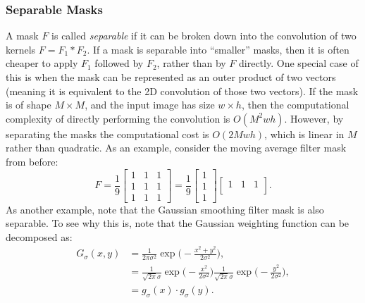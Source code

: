 \subsubsection{Separable Masks}
A mask $F$ is called \textit{separable} if it can be broken down into the convolution of two kernels $F = F_1 \ast F_2$. If a mask is separable into ``smaller'' masks, then it is often cheaper to apply $F_1$ followed by $F_2$, rather than by $F$ directly. One special case of this is when the mask can be represented as an outer product of two vectors (meaning it is equivalent to the 2D convolution of those two vectors). If the mask is of shape $M\times M$, and the input image has size $w\times h$, then the computational complexity of directly performing the convolution is $O(M^2wh)$. However, by separating the masks the computational cost is $O(2Mwh)$, which is linear in $M$ rather than quadratic. As an example, consider the moving average filter mask from before: 
\begin{equation*}
F = \frac{1}{9}
\begin{bmatrix}
1 & 1 & 1\\
1 & 1 & 1\\
1 & 1 & 1
\end{bmatrix} = \frac{1}{9}
\begin{bmatrix}
1 \\
1 \\
1
\end{bmatrix}
\begin{bmatrix}
1 & 1 & 1\\
\end{bmatrix}. 
\end{equation*}
As another example, note that the Gaussian smoothing filter mask is also separable. To see why this is, note that the Gaussian weighting function can be decomposed as:
\begin{equation*}
\begin{split}
G_\sigma(x,y) &= \frac{1}{2\pi\sigma^2} \exp \bigg(-\frac{x^2 + y^2}{2\sigma^2} \bigg), \\
    &= \frac{1}{\sqrt{2\pi}\sigma}\exp \bigg(-\frac{x^2}{2\sigma^2}\bigg)\frac{1}{\sqrt{2\pi}\sigma} \exp \bigg(-\frac{y^2}{2\sigma^2}\bigg), \\
    &= g_\sigma(x) \cdot g_\sigma(y).
\end{split}
\end{equation*}

